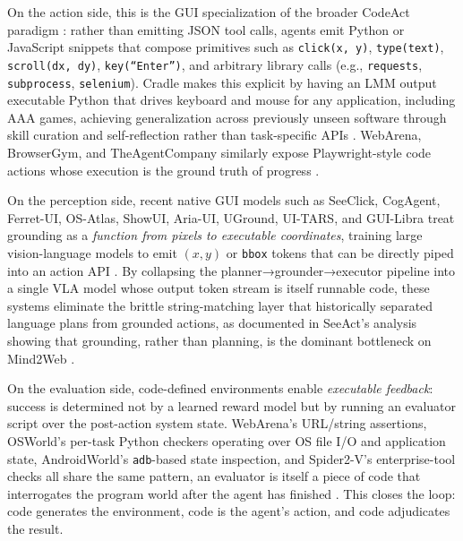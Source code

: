 \documentclass{llmxive}
\begin{document}
On the action side, this is the GUI specialization of the broader CodeAct paradigm \citep{wang2024executablecodeactionselicit}: rather than emitting JSON tool calls, agents emit Python or JavaScript snippets that compose primitives such as \texttt{click(x, y)}, \texttt{type(text)}, \texttt{scroll(dx, dy)}, \texttt{key(``Enter'')}, and arbitrary library calls (e.g., \texttt{requests}, \texttt{subprocess}, \texttt{selenium}). Cradle makes this explicit by having an LMM output executable Python that drives keyboard and mouse for any application, including AAA games, achieving generalization across previously unseen software through skill curation and self-reflection rather than task-specific APIs \citep{tan2024cradleempoweringfoundationagents}. WebArena, BrowserGym, and TheAgentCompany similarly expose Playwright-style code actions whose execution is the ground truth of progress \citep{zhou2024webarenarealisticwebenvironment,drouin2024workarenacapablewebagents,xu2025theagentcompanybenchmarkingllmagents}.

On the perception side, recent native GUI models such as SeeClick, CogAgent, Ferret-UI, OS-Atlas, ShowUI, Aria-UI, UGround, UI-TARS, and GUI-Libra treat grounding as a \textit{function from pixels to executable coordinates}, training large vision-language models to emit $(x, y)$ or \texttt{bbox} tokens that can be directly piped into an action API \citep{cheng2024seeclickharnessingguigrounding,hong2024cogagentvisuallanguagemodel,you2024ferretuigroundedmobileui,wu2024osatlasfoundationactionmodel,lin2024showuivisionlanguageactionmodelgui,yang2025ariauivisualgroundinggui,gou2025navigatingdigitalworldhumans,qin2025uitarspioneeringautomatedgui,yang2026guilibratrainingnativegui}. By collapsing the planner→grounder→executor pipeline into a single VLA model whose output token stream is itself runnable code, these systems eliminate the brittle string-matching layer that historically separated language plans from grounded actions, as documented in SeeAct's analysis showing that grounding, rather than planning, is the dominant bottleneck on Mind2Web \citep{zheng2024gpt4visiongeneralistwebagent}.

On the evaluation side, code-defined environments enable \textit{executable feedback}: success is determined not by a learned reward model but by running an evaluator script over the post-action system state. WebArena's URL/string assertions, OSWorld's per-task Python checkers operating over OS file I/O and application state, AndroidWorld's \texttt{adb}-based state inspection, and Spider2-V's enterprise-tool checks all share the same pattern, an evaluator is itself a piece of code that interrogates the program world after the agent has finished \citep{zhou2024webarenarealisticwebenvironment,xie2024osworldbenchmarkingmultimodalagents,rawles2025androidworlddynamicbenchmarkingenvironment,cao2024spider2vfarmultimodalagents}. This closes the loop: code generates the environment, code is the agent's action, and code adjudicates the result.
\end{document}
